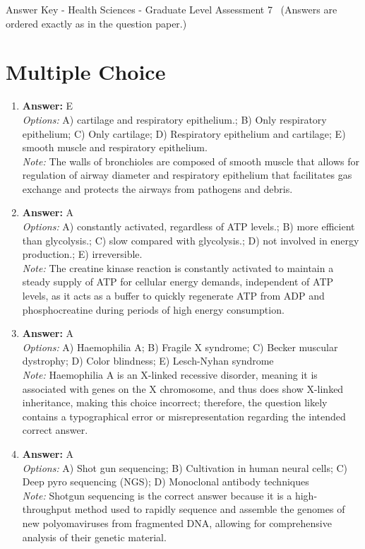 \documentclass[12pt]{article}
\begin{document}
\begin{center}
Answer Key - Health Sciences - Graduate Level Assessment 7 \
\small (Answers are ordered exactly as in the question paper.)
\end{center}

\section*{Multiple Choice}
\begin{enumerate}[label=\arabic*.]
\item \textbf{Answer:} E
\\ \textit{Options:} A) cartilage and respiratory epithelium.; B) Only respiratory epithelium; C) Only cartilage; D) Respiratory epithelium and cartilage; E) smooth muscle and respiratory epithelium.
\\ \textit{Note:} The walls of bronchioles are composed of smooth muscle that allows for regulation of airway diameter and respiratory epithelium that facilitates gas exchange and protects the airways from pathogens and debris.
\item \textbf{Answer:} A
\\ \textit{Options:} A) constantly activated, regardless of ATP levels.; B) more efficient than glycolysis.; C) slow compared with glycolysis.; D) not involved in energy production.; E) irreversible.
\\ \textit{Note:} The creatine kinase reaction is constantly activated to maintain a steady supply of ATP for cellular energy demands, independent of ATP levels, as it acts as a buffer to quickly regenerate ATP from ADP and phosphocreatine during periods of high energy consumption.
\item \textbf{Answer:} A
\\ \textit{Options:} A) Haemophilia A; B) Fragile X syndrome; C) Becker muscular dystrophy; D) Color blindness; E) Lesch-Nyhan syndrome
\\ \textit{Note:} Haemophilia A is an X-linked recessive disorder, meaning it is associated with genes on the X chromosome, and thus does show X-linked inheritance, making this choice incorrect; therefore, the question likely contains a typographical error or misrepresentation regarding the intended correct answer.
\item \textbf{Answer:} A
\\ \textit{Options:} A) Shot gun sequencing; B) Cultivation in human neural cells; C) Deep pyro sequencing (NGS); D) Monoclonal antibody techniques
\\ \textit{Note:} Shotgun sequencing is the correct answer because it is a high-throughput method used to rapidly sequence and assemble the genomes of new polyomaviruses from fragmented DNA, allowing for comprehensive analysis of their genetic material.

\end{enumerate}
\end{document}
